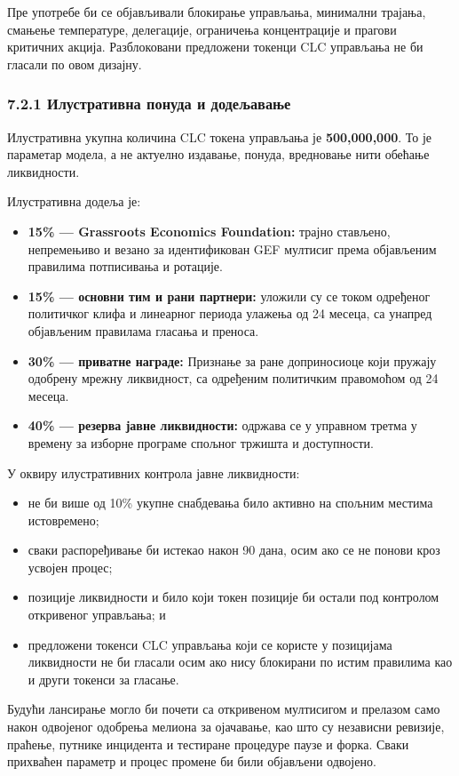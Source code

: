 \documentclass[11pt]{article}
\begin{document}
Пре употребе би се објављивали блокирање управљања, минимални трајања, смањење температуре, делегације, ограничења концентрације и прагови критичних акција. Разблоковани предложени токенци CLC управљања не би гласали по овом дизајну.

\subsubsection*{7.2.1 Илустративна понуда и додељавање}

Илустративна укупна количина CLC токена управљања је \textbf{500,000,000}. То је параметар модела, а не актуелно издавање, понуда, вредновање нити обећање ликвидности.

Илустративна додеља је:

\begin{itemize}[leftmargin=*]
\item \textbf{15\% --- Grassroots Economics Foundation:} трајно стављено, непремењиво и везано за идентификован GEF мултисиг према објављеним правилима потписивања и ротације.
\item \textbf{15\% --- основни тим и рани партнери:} уложили су се током одређеног политичког клифа и линеарног периода улажења од 24 месеца, са унапред објављеним правилама гласања и преноса.
\item \textbf{30\% --- приватне награде:} Признање за ране доприносиоце који пружају одобрену мрежну ликвидност, са одређеним политичким правомоћом од 24 месеца.
\item \textbf{40\% --- резерва јавне ликвидности:} одржава се у управном третма у времену за изборне програме спољног тржишта и доступности.
\end{itemize}
У оквиру илустративних контрола јавне ликвидности:

\begin{itemize}[leftmargin=*]
\item не би више од 10\% укупне снабдевања било активно на спољним местима истовремено;
\item сваки распоређивање би истекао након 90 дана, осим ако се не понови кроз усвојен процес;
\item позиције ликвидности и било који токен позиције би остали под контролом откривеног управљања; и
\item предложени токенси CLC управљања који се користе у позицијама ликвидности не би гласали осим ако нису блокирани по истим правилима као и други токенси за гласање.
\end{itemize}
Будући лансирање могло би почети са откривеном мултисигом и прелазом само након одвојеног одобрења мелиона за ојачавање, као што су независни ревизије, праћење, путнике инцидента и тестиране процедуре паузе и форка. Сваки прихваћен параметр и процес промене би били објављени одвојено.
\end{document}
